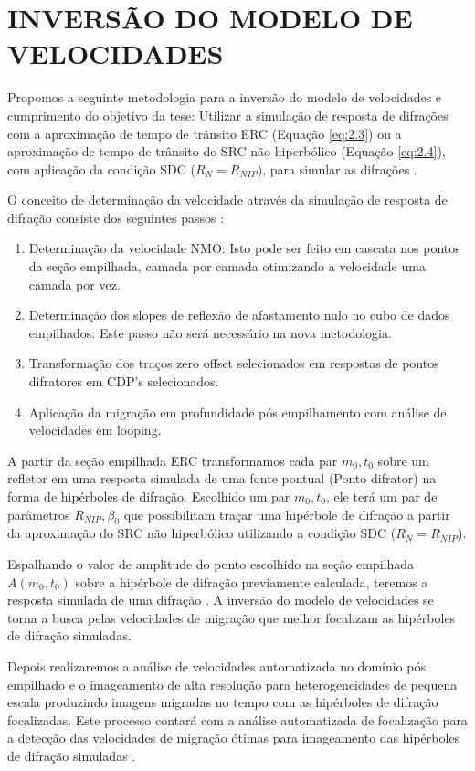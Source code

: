 \chapter{INVERSÃO DO MODELO DE VELOCIDADES}
\label{cap8:velocidades}

Propomos a seguinte metodologia para a inversão do modelo de velocidades e cumprimento do objetivo da tese:
Utilizar a simulação de resposta de difrações com a aproximação de tempo de trânsito ERC (Equação \ref{eq:2.3}) ou
a aproximação de tempo de trânsito do SRC não hiperbólico (Equação \ref{eq:2.4}), 
com aplicação da condição SDC ($R_N=R_{NIP}$),
para simular as difrações \cite{diffractions}.

O conceito de determinação da velocidade através da simulação de resposta de difração
consiste dos seguintes passos \cite{diffractions}:

\begin{enumerate}
 \item Determinação da velocidade NMO: Isto pode ser feito em cascata nos pontos da
seção empilhada, camada por camada otimizando a velocidade uma camada por vez.
\item Determinação dos slopes de reflexão de afastamento nulo no cubo de dados empilhados: 
Este passo não será necessário na nova metodologia.
\item Transformação dos traços zero offset selecionados em respostas de pontos difratores em CDP's
selecionados.
\item Aplicação da migração em profundidade pós empilhamento com análise de velocidades
em looping.
\end{enumerate}

A partir da seção empilhada ERC transformamos cada par $m_0, t_0$ sobre um refletor em uma resposta simulada de
uma fonte pontual (Ponto difrator) na forma de hipérboles de difração. Escolhido um par $m_0, t_0$, ele terá um par
de parâmetros $R_{NIP}, \beta_0$ que possibilitam traçar uma hipérbole de difração a partir da aproximação do SRC
não hiperbólico utilizando a condição SDC ($R_N=R_{NIP}$).

Espalhando o valor de amplitude do ponto escolhido na seção empilhada $A(m_0,t_0)$ sobre a hipérbole de difração
previamente calculada, teremos a resposta simulada de uma difração \cite{diffractions}. A inversão do modelo de velocidades
se torna a busca pelas velocidades de migração que melhor focalizam as hipérboles de difração simuladas.

Depois realizaremos a análise de velocidades automatizada no domínio pós empilhado e o imageamento de alta resolução
para heterogeneidades de pequena escala produzindo imagens migradas no tempo com as hipérboles de difração
focalizadas. Este processo contará com a análise automatizada de focalização para a detecção das
velocidades de migração ótimas para imageamento das hipérboles de difração simuladas \cite{sep_dif}.

